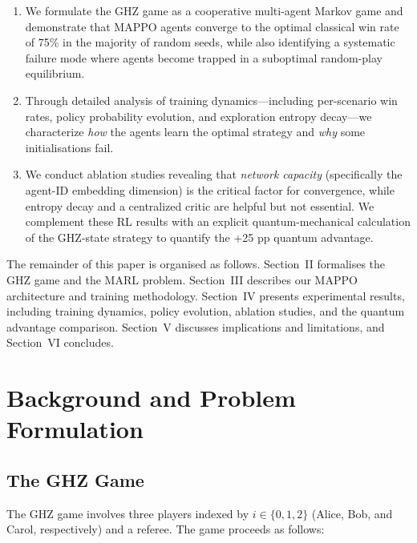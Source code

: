 \documentclass[conference]{IEEEtran}
\begin{document}
\begin{enumerate}
    \item We formulate the GHZ game as a cooperative multi-agent Markov game and demonstrate that MAPPO agents converge to the optimal classical win rate of 75\% in the majority of random seeds, while also identifying a systematic failure mode where agents become trapped in a suboptimal random-play equilibrium.
    \item Through detailed analysis of training dynamics---including per-scenario win rates, policy probability evolution, and exploration entropy decay---we characterize \emph{how} the agents learn the optimal strategy and \emph{why} some initialisations fail.
    \item We conduct ablation studies revealing that \emph{network capacity} (specifically the agent-ID embedding dimension) is the critical factor for convergence, while entropy decay and a centralized critic are helpful but not essential. We complement these RL results with an explicit quantum-mechanical calculation of the GHZ-state strategy to quantify the +25 pp quantum advantage.
\end{enumerate}

The remainder of this paper is organised as follows. Section~II formalises the GHZ game and the MARL problem. Section~III describes our MAPPO architecture and training methodology. Section~IV presents experimental results, including training dynamics, policy evolution, ablation studies, and the quantum advantage comparison. Section~V discusses implications and limitations, and Section~VI concludes.

\section{Background and Problem Formulation}

\subsection{The GHZ Game}

The GHZ game involves three players indexed by $i \in \{0, 1, 2\}$ (Alice, Bob, and Carol, respectively) and a referee. The game proceeds as follows:
\end{document}
